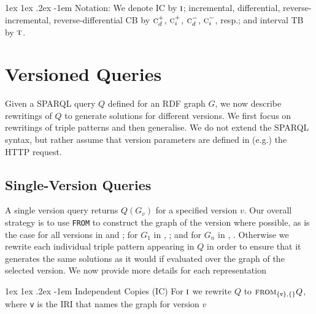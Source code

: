 \documentclass{llncs}
\makeatletter
\renewcommand\paragraph{\@startsection{paragraph}{4}{\z@}%
	{1ex \@plus1ex \@minus.2ex}%
	{-1em}%
	{\normalfont\normalsize\itshape}}
\newcommand{\sfrom}[3]{\ensuremath{\textsc{from}_{#2,#3}#1}}
\makeatother
\begin{document}
\paragraph{Notation:} We denote IC by $\textsc{i}$; incremental, differential, reverse-incremental, reverse-differential CB by $\textsc{c}_d^{+}$, $\textsc{c}_i^{+}$, $\textsc{c}_d^{-}$, $\textsc{c}_i^{-}$, resp.; and interval TB by $\textsc{t}$.



\section{Versioned Queries}

Given a SPARQL query $Q$ defined for an RDF graph $G$, we now describe rewritings of $Q$ to generate solutions for different versions. We first focus on rewritings of triple patterns and then generalise. We do not extend the SPARQL syntax, but rather assume that version parameters are defined in (e.g.) the HTTP request. 

\subsection{Single-Version Queries} A single version query returns $Q(G_v)$ for a specified version $v$. Our overall strategy is to use \texttt{FROM} to construct the graph of the version where possible, as is the case for all versions in \ic and \tb; for $G_1$ in \cbpd, \cbpi; and for $G_n$ in \cbmd, \cbmi. Otherwise we rewrite each individual triple pattern appearing in $Q$ in order to ensure that it generates the same solutions as it would if evaluated over the graph of the selected version. We now provide more details for each representation

\paragraph{Independent Copies (IC)} For $\textsc{i}$ we rewrite $Q$ to \sfrom{Q}{\{\texttt{v}\}}{\{\}}, where \texttt{v} is the IRI that names the graph for version $v$
\end{document}
